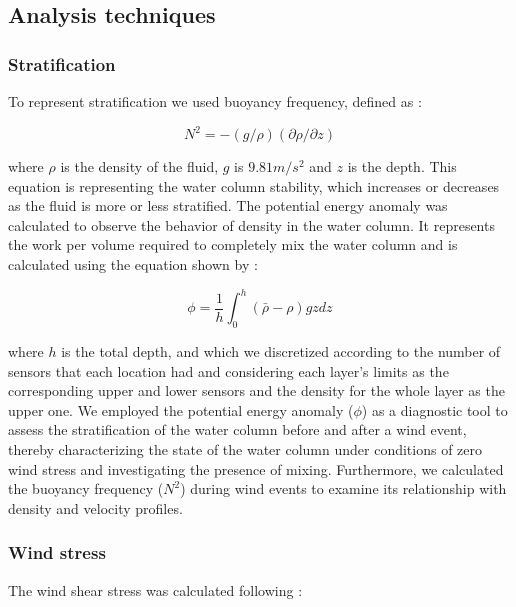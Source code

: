 \documentclass[tesis.tex]{subfiles}
\begin{document}
\subsection{Analysis techniques}

\subsubsection{Stratification}

To represent stratification we used buoyancy frequency, defined as \citep{kundu2002fluid}:

\begin{equation}
    N^2 = -(g/\rho)(\partial \rho/\partial z)
    \label{eq: N2}
\end{equation}

where $\rho$ is the density of the fluid, $g$ is $9.81 m/s^2$ and $z$ is the depth. This equation is representing the water column stability, which increases or decreases as the fluid is more or less stratified. The potential energy anomaly was calculated to observe the behavior of density in the water column. It represents the work per volume required to completely mix the water column and is calculated using the equation shown by \cite{simpson1990tidal}: 

\begin{equation}
    \phi=\frac{1}{h}\int^h_0(\bar{\rho}-\rho)gzdz
    \label{eq: phi}
\end{equation}

where $h$ is the total depth, and which we discretized according to the number of sensors that each location had and considering each layer's limits as the corresponding upper and lower sensors and the density for the whole layer as the upper one. We employed the potential energy anomaly ($\phi$) as a diagnostic tool to assess the stratification of the water column before and after a wind event, thereby characterizing the state of the water column under conditions of zero wind stress and investigating the presence of mixing. Furthermore, we calculated the buoyancy frequency ($N^2$) during wind events to examine its relationship with density and velocity profiles.

\subsubsection{Wind stress}

The wind shear stress was calculated following \cite{read2011derivation}: 
\end{document}
